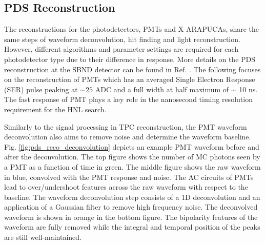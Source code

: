 \subsection{PDS Reconstruction}

The reconstructions for the photodetectors, PMTs and X-ARAPUCAs, share the same steps of waveform deconvolution, hit finding and light reconstruction.
However, different algorithms and parameter settings are required for each photodetector type due to their difference in response.
More details on the PDS reconstruction at the SBND detector can be found in Ref. \cite{sbnd_pds_paper}.
The following focuses on the reconstruction of PMTs which has an averaged Single Electron Response 
(SER) pulse peaking at $\sim 25$ ADC and a full width at half maximum of $\sim$ 10 ns.
The fast response of PMT plays a key role in the nanosecond timing resolution requirement for the HNL 
search.

Similarly to the signal processing in TPC reconstruction, the PMT waveform deconvolution also aims to remove noise and determine the waveform baseline.
Fig. \ref{fig:pds_reco_deconvolution} \cite{sbnd_pds_paper} depicts an example PMT waveform before and after the deconvolution.
The top figure shows the number of MC photons seen by a PMT as a function of time in green.
The middle figure shows the raw waveform in blue, convolved with the PMT response and noise.
The AC circuits of PMTs lead to over/undershoot features across the raw waveform with respect to the baseline.
The waveform deconvolution step consists of a 1D deconvolution and an application of a Gaussian filter to 
remove high frequency noise.                                                                            
The deconvolved waveform is shown in orange in the bottom figure.
The bipolarity features of the waveform are fully removed while the integral and temporal position of the peaks are still well-maintained.

